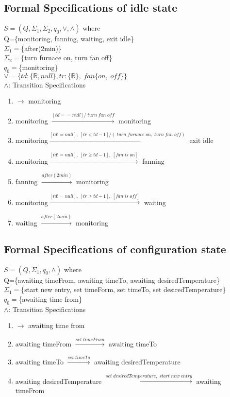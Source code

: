 \documentclass[12pt]{article}
\begin{document}
\subsection{Formal Specifications of idle state}
$S=(Q, \Sigma_{1}, \Sigma_{2}, q_{0}, \vee, \wedge)$ where\\
Q=\{monitoring, fanning, waiting, exit idle\}\\
$\Sigma_{1}=$\{after(2min)\} \\
$\Sigma_{2}=$\{turn furnace on, turn fan off\} \\
$q_{0}=$\{monitoring\}\\
$\vee=\{td:\{\mathbb{R}, null\}, tr:\{\mathbb{R}\},\;fan\{on,\;off\}\}$\\
$\wedge$: Transition Specifications
\begin{enumerate}
\item $\rightarrow$ monitoring
\item monitoring $\xrightarrow{[td == null]/\;turn\;fan\;off}$ monitoring
\item monitoring$\xrightarrow{[td != null],\;[tr < td-1]/(\;turn\;furnace\;on,\;turn\;fan\;off)}$ exit idle 
\item monitoring$\xrightarrow{[td != null],\;[tr \geq td-1],\;[fan\;is\;on]}$ fanning 
\item fanning $\xrightarrow{after(2min)}$ monitoring
\item monitoring$\xrightarrow{[td != null],\;[tr \geq td-1],\;[fan\;is\;off]}$ waiting
\item waiting $\xrightarrow{after(2min)}$ monitoring

\end{enumerate}

\subsection{Formal Specifications of configuration state}
$S=(Q, \Sigma_{1}, q_{0}, \wedge)$ where\\
Q=\{awaiting timeFrom, awaiting timeTo, awaiting desiredTemperature\}\\
$\Sigma_{1}=$\{start new entry, set timeForm, set timeTo, set desiredTemperature\} \\
$q_{0}=$\{awaiting time from\}\\
$\wedge$: Transition Specifications
\begin{enumerate}
\item $\rightarrow$ awaiting time from
\item awaiting timeFrom $\xrightarrow{set\;timeFrom}$ awaiting timeTo
\item awaiting timeTo $\xrightarrow{set\;timeTo}$ awaiting desiredTemperature
\item awaiting desiredTemperature $\xrightarrow{set\;desiredTemperature,\;start\;new\;entry}$ awaiting timeFrom
\end{enumerate}
\end{document}
